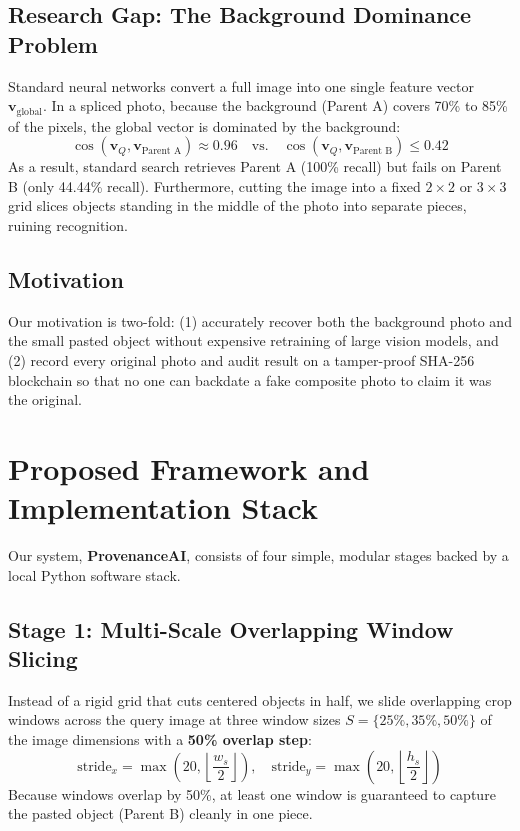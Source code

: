 \documentclass[12pt,a4paper]{article}
\begin{document}
\subsection{Research Gap: The Background Dominance Problem}
Standard neural networks convert a full image into one single feature vector $\mathbf{v}_{\text{global}}$. In a spliced photo, because the background (Parent A) covers 70\% to 85\% of the pixels, the global vector is dominated by the background:
\begin{equation}
\cos(\mathbf{v}_Q, \mathbf{v}_{\text{Parent A}}) \approx 0.96 \quad \text{vs.} \quad \cos(\mathbf{v}_Q, \mathbf{v}_{\text{Parent B}}) \le 0.42
\end{equation}
As a result, standard search retrieves Parent A (100\% recall) but fails on Parent B (only 44.44\% recall). Furthermore, cutting the image into a fixed $2\times2$ or $3\times3$ grid slices objects standing in the middle of the photo into separate pieces, ruining recognition.

\subsection{Motivation}
Our motivation is two-fold: (1) accurately recover both the background photo and the small pasted object without expensive retraining of large vision models, and (2) record every original photo and audit result on a tamper-proof SHA-256 blockchain so that no one can backdate a fake composite photo to claim it was the original.

\section{Proposed Framework and Implementation Stack}
Our system, \textbf{ProvenanceAI}, consists of four simple, modular stages backed by a local Python software stack.

\subsection{Stage 1: Multi-Scale Overlapping Window Slicing}
Instead of a rigid grid that cuts centered objects in half, we slide overlapping crop windows across the query image at three window sizes $S = \{25\%, 35\%, 50\%\}$ of the image dimensions with a \textbf{50\% overlap step}:
\begin{equation}
\text{stride}_x = \max\left(20, \left\lfloor \frac{w_s}{2} \right\rfloor\right), \quad \text{stride}_y = \max\left(20, \left\lfloor \frac{h_s}{2} \right\rfloor\right)
\end{equation}
Because windows overlap by 50\%, at least one window is guaranteed to capture the pasted object (Parent B) cleanly in one piece.
\end{document}
